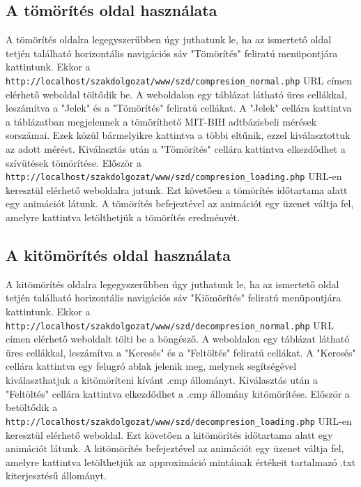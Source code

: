 \documentclass[oneside,titlepage,12pt,a4paper]{report}
\begin{document}
\subsection*{A tömörítés oldal használata}

A tömörítés oldalra legegyszerűbben úgy juthatunk le, ha az ismertető oldal tetjén található horizontális navigációs sáv "Tömörítés" feliratú menüpontjára kattintunk. Ekkor a \texttt{http://localhost/szakdolgozat/www/szd/compresion\_normal.php} URL címen elérhető weboldal töltődik be. A weboldalon egy táblázat látható üres cellákkal, leszámítva a "Jelek" és a "Tömörítés" feliratú cellákat. A "Jelek" cellára kattintva a táblázatban megjelennek a tömöríthető MIT-BIH adtbázisbeli mérések sorszámai. Ezek közül bármelyikre kattintva a többi eltűnik, ezzel kiválasztottuk az adott mérést. Kiválasztás után a "Tömörítés" cellára kattintva elkezdődhet a szívütések tömörítése. Először a \texttt{http://localhost/szakdolgozat/www/szd/compresion\_loading.php} \linebreak URL-en keresztül elérhető weboldalra jutunk. Ezt követően a tömörítés időtartama alatt egy animációt látunk. A tömörítés befejeztével az animációt egy üzenet váltja fel, amelyre kattintva letölthetjük a tömörítés eredményét.

\subsection*{A kitömörítés oldal használata}

A kitömörítés oldalra legegyszerűbben úgy juthatunk le, ha az ismertető oldal tetjén található horizontális navigációs sáv "Kiömörítés" feliratú menüpontjára kattintunk. Ekkor a \texttt{http://localhost/szakdolgozat/www/szd/decompresion\_normal.php} \linebreak URL címen elérhető weboldalt tölti be a böngésző. A weboldalon egy táblázat látható üres cellákkal, leszámítva a "Keresés" és a "Feltöltés" feliratú cellákat. A "Keresés" cellára kattintva egy felugró ablak jelenik meg, melynek segítségével kiválaszthatjuk a kitömöríteni kívánt .cmp állományt. Kiválasztás után a "Feltöltés" cellára kattintva elkezdődhet a .cmp állomány kitömörítése. Először a betöltődik a \texttt{http://localhost/szakdolgozat/www/szd/decompresion\_loading.php} URL-en \linebreak keresztül elérhető weboldal. Ezt követően a kitömörítés időtartama alatt egy animációt látunk. A kitömörítés befejeztével az animációt egy üzenet váltja fel, amelyre kattintva letölthetjük az approximáció mintáinak értékeit tartalmazó .txt kiterjesztésű állományt.
\end{document}
